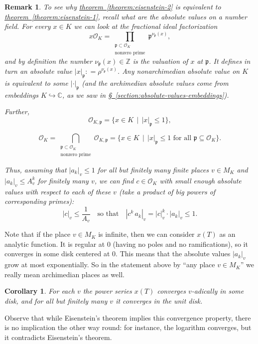 \documentclass{article}
\newcommand{\dfn}{\mathrel{\mathop:}=}
\newcommand{\ZZ}{\mathbb{Z}}
\renewcommand{\O}{\mathcal{O}}
\newcommand{\refref}[2]{\hyperref[#2]{#1~\ref*{#2}}}
\theoremstyle{myplain}
\newtheorem{corollary}[proposition]{Corollary}
\theoremstyle{mydefinition}
\newtheorem{remark}[proposition]{Remark}
\begin{document}
\begin{remark}
  To see why \refref{theorem}{theorem:eisenstein-2} is equivalent to
  \refref{theorem}{theorem:eisenstein-1}, recall what are the absolute values on
  a number field. For every $x \in K$ we can look at the \emph{fractional} ideal
  factorization
  $$x \O_K = \prod_{\substack{\mathfrak{p} \subset \O_K \\ \text{nonzero prime}}} \mathfrak{p}^{\nu_\mathfrak{p} (x)},$$
  and by definition the number $\nu_\mathfrak{p} (x) \in \ZZ$ is the
  \emph{valuation} of $x$ at $\mathfrak{p}$. It defines in turn an absolute
  value $|x|_\mathfrak{p} \dfn \rho^{\nu_\mathfrak{p} (x)}$. Any nonarchimedian
  absolute value on $K$ is equivalent to some $|\cdot|_\mathfrak{p}$ (and the
  archimedian absolute values come from embeddings
  $K \hookrightarrow \mathbb{C}$, as we saw in
  \refref{\S}{section:absolute-values-embeddings}).

  Further,
  \[ \O_{K,\mathfrak{p}} = \{ x\in K \,\mid\, |x|_\mathfrak{p} \le 1 \}, \]

  \[ \O_K = \bigcap_{\substack{\mathfrak{p} \subset \O_K \\ \text{nonzero prime}}} \O_{K,\mathfrak{p}} =
    \{ x\in K \,\mid\, |x|_\mathfrak{p} \le 1 \text{ for all } \mathfrak{p} \subseteq \O_K \}. \]

  Thus, assuming that $|a_k|_v \le 1$ for all but finitely many finite places
  $v\in M_K$ and $|a_k|_v \le A_v^k$ for \emph{finitely many} $v$, we can find
  $c \in \O_K$ with small enough absolute values with respect to each of these
  $v$ (take a product of big powers of corresponding primes):
  \[ |c|_v \le \frac{1}{A_v} \quad \text{so that} \quad |c^k \, a_k|_v = |c|_v^k \cdot |a_k|_v \le 1. \]
\end{remark}

Note that if the place $v \in M_K$ is infinite, then we can consider $x (T)$ as
an analytic function. It is regular at $0$ (having no poles and no
ramifications), so it converges in some disk centered at $0$. This means that
the absolute values $|a_k|_v$ grow at most exponentially. So in the statement
above by ``any place $v \in M_K$'' we really mean archimedian places as well.

\begin{corollary}
  For each $v$ the power series $x (T)$ converges $v$-adically in \emph{some}
  disk, and for all but finitely many $v$ it converges in the unit disk.
\end{corollary}

Observe that while Eisenstein's theorem implies this convergence property,
there is no implication the other way round: for instance, the logarithm
converges, but it contradicts Eisenstein's theorem.
\end{document}
